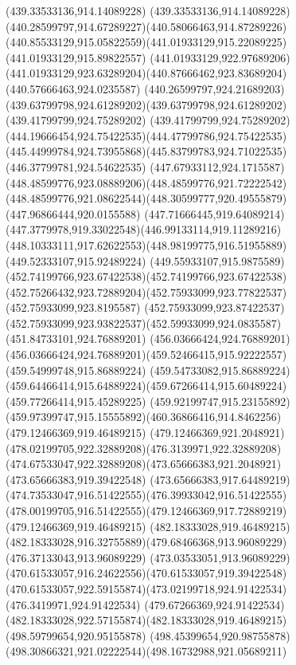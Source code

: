 {{{{				\lineto(439.33533136,914.14089228)
				\curveto(439.33533136,914.14089228)(440.28599797,914.67289227)(440.58066463,914.87289226)
				\curveto(440.85533129,915.05822559)(441.01933129,915.22089225)(441.01933129,915.89822557)
				\lineto(441.01933129,922.97689206)
				\curveto(441.01933129,923.63289204)(440.87666462,923.83689204)(440.57666463,924.0235587)
				\curveto(440.26599797,924.21689203)(439.63799798,924.61289202)(439.63799798,924.61289202)
				\lineto(439.41799799,924.75289202)
				\curveto(439.41799799,924.75289202)(444.19666454,924.75422535)(444.47799786,924.75422535)
				\curveto(445.44999784,924.73955868)(445.83799783,924.71022535)(446.37799781,924.54622535)
				\curveto(447.67933112,924.1715587)(448.48599776,923.08889206)(448.48599776,921.72222542)
				\curveto(448.48599776,921.08622544)(448.30599777,920.49555879)(447.96866444,920.0155588)
				\curveto(447.71666445,919.64089214)(447.3779978,919.33022548)(446.99133114,919.11289216)
				\curveto(448.10333111,917.62622553)(448.98199775,916.51955889)(449.52333107,915.92489224)
				\curveto(449.55933107,915.9875589)(452.74199766,923.67422538)(452.74199766,923.67422538)
				\curveto(452.75266432,923.72889204)(452.75933099,923.77822537)(452.75933099,923.8195587)
				\curveto(452.75933099,923.87422537)(452.75933099,923.93822537)(452.59933099,924.0835587)
				\lineto(451.84733101,924.76889201)
				\lineto(456.03666424,924.76889201)
				\curveto(456.03666424,924.76889201)(459.52466415,915.92222557)(459.54999748,915.86889224)
				\lineto(459.54733082,915.86889224)
				\curveto(459.64466414,915.64889224)(459.67266414,915.60489224)(459.77266414,915.45289225)
				\curveto(459.92199747,915.23155892)(459.97399747,915.15555892)(460.36866416,914.8462256)
				\moveto(479.12466369,919.46489215)
				\curveto(479.12466369,921.2048921)(478.02199705,922.32889208)(476.3139971,922.32889208)
				\curveto(474.67533047,922.32889208)(473.65666383,921.2048921)(473.65666383,919.39422548)
				\curveto(473.65666383,917.64489219)(474.73533047,916.51422555)(476.39933042,916.51422555)
				\curveto(478.00199705,916.51422555)(479.12466369,917.72889219)(479.12466369,919.46489215)
				\moveto(482.18333028,919.46489215)
				\curveto(482.18333028,916.32755889)(479.68466368,913.96089229)(476.37133043,913.96089229)
				\curveto(473.03533051,913.96089229)(470.61533057,916.24622556)(470.61533057,919.39422548)
				\curveto(470.61533057,922.59155874)(473.02199718,924.91422534)(476.3419971,924.91422534)
				\curveto(479.67266369,924.91422534)(482.18333028,922.57155874)(482.18333028,919.46489215)
				\moveto(498.59799654,920.95155878)
				\curveto(498.45399654,920.98755878)(498.30866321,921.02222544)(498.16732988,921.05689211)
}}}}
